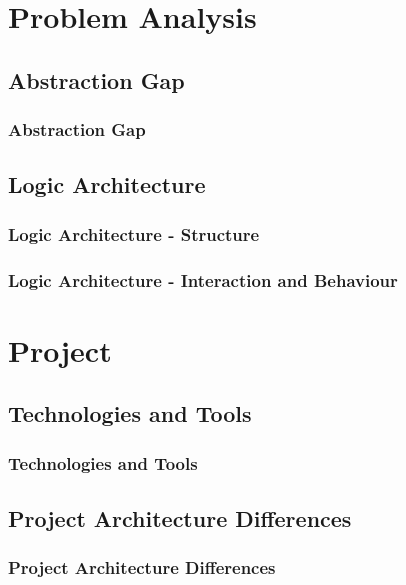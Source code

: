 \documentclass{beamer}
\begin{document}
\section{Problem Analysis}

\subsection{Abstraction Gap}

\begin{frame}
  \frametitle{Abstraction Gap}
\end{frame}

\subsection{Logic Architecture}

\begin{frame}
  \frametitle{Logic Architecture - Structure}
\end{frame}
\begin{frame}
  \frametitle{Logic Architecture - Interaction and Behaviour}
\end{frame}

\section{Project}

\subsection{Technologies and Tools}

\begin{frame}
  \frametitle{Technologies and Tools}
\end{frame}

\subsection{Project Architecture Differences}

\begin{frame}
  \frametitle{Project Architecture Differences}
\end{frame}
\end{document}
